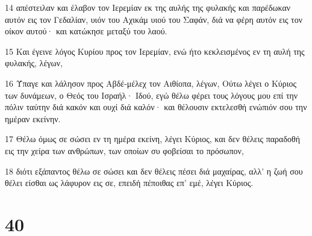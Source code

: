 \par 14 απέστειλαν και έλαβον τον Ιερεμίαν εκ της αυλής της φυλακής και παρέδωκαν αυτόν εις τον Γεδαλίαν, υιόν του Αχικάμ υιού του Σαφάν, διά να φέρη αυτόν εις τον οίκον αυτού· και κατώκησε μεταξύ του λαού.
\par 15 Και έγεινε λόγος Κυρίου προς τον Ιερεμίαν, ενώ ήτο κεκλεισμένος εν τη αυλή της φυλακής, λέγων,
\par 16 Ύπαγε και λάλησον προς Αβδέ-μέλεχ τον Αιθίοπα, λέγων, Ούτω λέγει ο Κύριος των δυνάμεων, ο Θεός του Ισραήλ· Ιδού, εγώ θέλω φέρει τους λόγους μου επί την πόλιν ταύτην διά κακόν και ουχί διά καλόν· και θέλουσιν εκτελεσθή ενώπιόν σου την ημέραν εκείνην.
\par 17 Θέλω όμως σε σώσει εν τη ημέρα εκείνη, λέγει Κύριος, και δεν θέλεις παραδοθή εις την χείρα των ανθρώπων, των οποίων συ φοβείσαι το πρόσωπον,
\par 18 διότι εξάπαντος θέλω σε σώσει και δεν θέλεις πέσει διά μαχαίρας, αλλ' η ζωή σου θέλει είσθαι ως λάφυρον εις σε, επειδή πέποιθας επ' εμέ, λέγει Κύριος.

\chapter{40}

